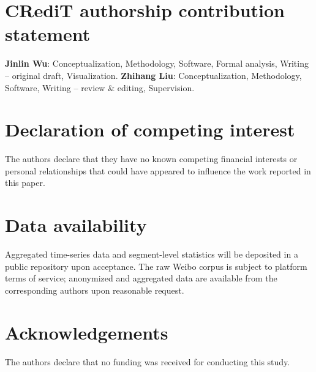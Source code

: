 \documentclass[preprint,12pt]{elsarticle}
\begin{document}
\FloatBarrier


\section*{CRediT authorship contribution statement}
\textbf{Jinlin Wu}: Conceptualization, Methodology, Software, Formal analysis, Writing -- original draft, Visualization.
\textbf{Zhihang Liu}: Conceptualization, Methodology, Software, Writing -- review \& editing, Supervision.

\section*{Declaration of competing interest}
The authors declare that they have no known competing financial interests or personal relationships that could have appeared to influence the work reported in this paper.

\section*{Data availability}
Aggregated time-series data and segment-level statistics will be deposited in a public repository upon acceptance. The raw Weibo corpus is subject to platform terms of service; anonymized and aggregated data are available from the corresponding authors upon reasonable request.

\section*{Acknowledgements}
The authors declare that no funding was received for conducting this study.



\end{document}
